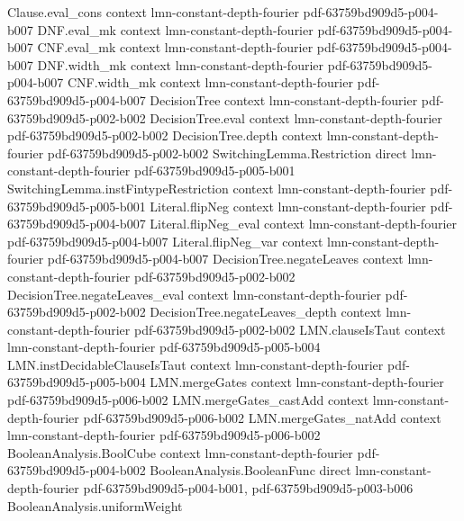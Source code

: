 \begin{lemma}
\proofstep
  {Clause.eval_cons}
  {context}
  {lmn-constant-depth-fourier}
  {pdf-63759bd909d5-p004-b007}
\proofstep
  {DNF.eval_mk}
  {context}
  {lmn-constant-depth-fourier}
  {pdf-63759bd909d5-p004-b007}
\proofstep
  {CNF.eval_mk}
  {context}
  {lmn-constant-depth-fourier}
  {pdf-63759bd909d5-p004-b007}
\proofstep
  {DNF.width_mk}
  {context}
  {lmn-constant-depth-fourier}
  {pdf-63759bd909d5-p004-b007}
\proofstep
  {CNF.width_mk}
  {context}
  {lmn-constant-depth-fourier}
  {pdf-63759bd909d5-p004-b007}
\proofstep
  {DecisionTree}
  {context}
  {lmn-constant-depth-fourier}
  {pdf-63759bd909d5-p002-b002}
\proofstep
  {DecisionTree.eval}
  {context}
  {lmn-constant-depth-fourier}
  {pdf-63759bd909d5-p002-b002}
\proofstep
  {DecisionTree.depth}
  {context}
  {lmn-constant-depth-fourier}
  {pdf-63759bd909d5-p002-b002}
\proofstep
  {SwitchingLemma.Restriction}
  {direct}
  {lmn-constant-depth-fourier}
  {pdf-63759bd909d5-p005-b001}
\proofstep
  {SwitchingLemma.instFintypeRestriction}
  {context}
  {lmn-constant-depth-fourier}
  {pdf-63759bd909d5-p005-b001}
\proofstep
  {Literal.flipNeg}
  {context}
  {lmn-constant-depth-fourier}
  {pdf-63759bd909d5-p004-b007}
\proofstep
  {Literal.flipNeg_eval}
  {context}
  {lmn-constant-depth-fourier}
  {pdf-63759bd909d5-p004-b007}
\proofstep
  {Literal.flipNeg_var}
  {context}
  {lmn-constant-depth-fourier}
  {pdf-63759bd909d5-p004-b007}
\proofstep
  {DecisionTree.negateLeaves}
  {context}
  {lmn-constant-depth-fourier}
  {pdf-63759bd909d5-p002-b002}
\proofstep
  {DecisionTree.negateLeaves_eval}
  {context}
  {lmn-constant-depth-fourier}
  {pdf-63759bd909d5-p002-b002}
\proofstep
  {DecisionTree.negateLeaves_depth}
  {context}
  {lmn-constant-depth-fourier}
  {pdf-63759bd909d5-p002-b002}
\proofstep
  {LMN.clauseIsTaut}
  {context}
  {lmn-constant-depth-fourier}
  {pdf-63759bd909d5-p005-b004}
\proofstep
  {LMN.instDecidableClauseIsTaut}
  {context}
  {lmn-constant-depth-fourier}
  {pdf-63759bd909d5-p005-b004}
\proofstep
  {LMN.mergeGates}
  {context}
  {lmn-constant-depth-fourier}
  {pdf-63759bd909d5-p006-b002}
\proofstep
  {LMN.mergeGates_castAdd}
  {context}
  {lmn-constant-depth-fourier}
  {pdf-63759bd909d5-p006-b002}
\proofstep
  {LMN.mergeGates_natAdd}
  {context}
  {lmn-constant-depth-fourier}
  {pdf-63759bd909d5-p006-b002}
\proofstep
  {BooleanAnalysis.BoolCube}
  {context}
  {lmn-constant-depth-fourier}
  {pdf-63759bd909d5-p004-b002}
\proofstep
  {BooleanAnalysis.BooleanFunc}
  {direct}
  {lmn-constant-depth-fourier}
  {pdf-63759bd909d5-p004-b001,
    pdf-63759bd909d5-p003-b006}
\proofstep
  {BooleanAnalysis.uniformWeight}

\end{lemma}
